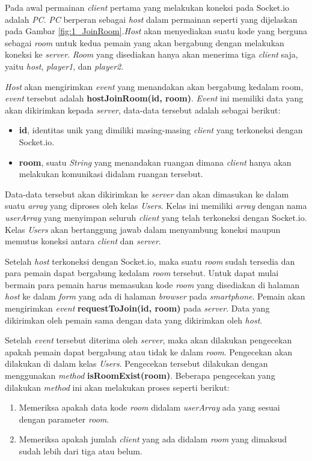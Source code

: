 Pada awal permainan \textit{client} pertama yang melakukan koneksi pada Socket.io adalah \textit{PC}. \textit{PC} berperan sebagai \textit{host} dalam permainan seperti yang dijelaskan pada Gambar \ref{fig:1_JoinRoom}.\textit{Host} akan menyediakan suatu kode yang berguna sebagai \textit{room} untuk kedua pemain yang akan bergabung dengan melakukan koneksi ke \textit{server}. \textit{Room} yang disediakan hanya akan menerima tiga \textit{client} saja, yaitu \textit{host}, \textit{player1}, dan \textit{player2}. 

\textit{Host} akan mengirimkan \textit{event} yang menandakan akan bergabung kedalam room, \textit{event} tersebut adalah \textbf{hostJoinRoom(id, room)}. \textit{Event} ini memiliki data yang akan dikirimkan kepada \textit{server}, data-data tersebut adalah sebagai berikut:
\begin{itemize}
	\item \textbf{id}, identitas unik yang dimiliki masing-masing \textit{client} yang terkoneksi dengan Socket.io.
	\item \textbf{room}, suatu \textit{String} yang menandakan ruangan dimana \textit{client} hanya akan melakukan komunikasi didalam ruangan tersebut.
\end{itemize}

Data-data tersebut akan dikirimkan ke \textit{server} dan akan dimasukan ke dalam suatu \textit{array} yang diproses oleh kelas \textit{Users}. Kelas ini memiliki \textit{array} dengan nama \textit{userArray} yang menyimpan seluruh \textit{client} yang telah terkoneksi dengan Socket.io. Kelas \textit{Users} akan bertanggung jawab dalam menyambung koneksi maupun memutus koneksi antara \textit{client} dan \textit{server}.

Setelah \textit{host} terkoneksi dengan Socket.io, maka suatu \textit{room} sudah tersedia dan para pemain dapat bergabung kedalam \textit{room} tersebut. Untuk dapat mulai bermain para pemain harus memasukan kode \textit{room} yang disediakan di halaman \textit{host} ke dalam \textit{form} yang ada di halaman \textit{browser} pada \textit{smartphone}. Pemain akan mengirimkan \textit{event} \textbf{requestToJoin(id, room)} pada \textit{server}. Data yang dikirimkan oleh pemain sama dengan data yang dikirimkan oleh \textit{host}. 

Setelah \textit{event} tersebut diterima oleh \textit{server}, maka akan dilakukan pengecekan apakah pemain dapat bergabung atau tidak ke dalam \textit{room}. Pengecekan akan dilakukan di dalam kelas \textit{Users}. Pengecekan tersebut dilakukan dengan menggunakan \textit{method} \textbf{isRoomExist(room)}. Beberapa pengecekan yang dilakukan \textit{method} ini akan melakukan proses seperti berikut:
\begin{enumerate}
	\item Memeriksa apakah data kode \textit{room} didalam \textit{userArray} ada yang sesuai dengan parameter \textit{room}.
	\item Memeriksa apakah jumlah \textit{client} yang ada didalam \textit{room} yang dimaksud sudah lebih dari tiga atau belum.
\end{enumerate}

